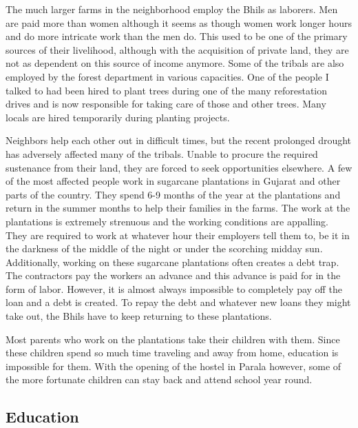 \documentclass[report.tex]{subfiles}
\begin{document}
The much larger farms in the neighborhood employ the Bhils as laborers. Men are paid more than women although it seems as though women work longer hours and do more intricate work than the men do. This used to be one of the primary sources of their livelihood, although with the acquisition of private land, they are not as dependent on this source of income anymore. Some of the tribals are also employed by the forest department in various capacities. One of the people I talked to had been hired to plant trees during one of the many reforestation drives and is now responsible for taking care of those and other trees. Many locals are hired temporarily during planting projects.

Neighbors help each other out in difficult times, but the recent prolonged drought has adversely affected many of the tribals. Unable to procure the required sustenance from their land, they are forced to seek opportunities elsewhere. A few of the most affected people work in sugarcane plantations in Gujarat and other parts of the country. They spend 6-9 months of the year at the plantations and return in the summer months to help their families in the farms. The work at the plantations is extremely strenuous and the working conditions are appalling. They are required to work at whatever hour their employers tell them to, be it in the darkness of the middle of the night or under the scorching midday sun. Additionally, working on these sugarcane plantations often creates a debt trap. The contractors pay the workers an advance and this advance is paid for in the form of labor. However, it is almost always impossible to completely pay off the loan and a debt is created. To repay the debt and whatever new loans they might take out, the Bhils have to keep returning to these plantations.

Most parents who work on the plantations take their children with them. Since these children spend so much time traveling and away from home, education is impossible for them. With the opening of the hostel in Parala however, some of the more fortunate children can stay back and attend school year round.

\subsection{Education}\label{subsec:education}
\end{document}

